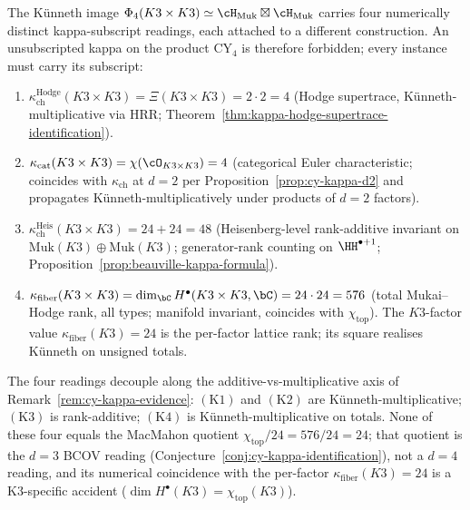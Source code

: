 \begin{remark}
\label{rem:phi-4-k3-k3-kappa-quartet}
%
%
The K\"unneth image $\Phi_4(K3 \times K3) \simeq \cH_{\mathrm{Muk}} \boxtimes \cH_{\mathrm{Muk}}$ carries four numerically distinct kappa-subscript readings, each attached to a different construction. An unsubscripted kappa on the product CY$_4$ is therefore forbidden; every instance must carry its subscript:
\begin{enumerate}[label=\textup{(K\arabic*)}]
\item $\kappa_{\mathrm{ch}}^{\mathrm{Hodge}}(K3 \times K3) = \Xi(K3 \times K3) = 2 \cdot 2 = 4$ \textup{(}Hodge supertrace, K\"unneth-multiplicative via HRR; Theorem~\textup{\ref{thm:kappa-hodge-supertrace-identification}}\textup{).}
\item $\kappa_{\mathrm{cat}}(K3 \times K3) = \chi(\cO_{K3 \times K3}) = 4$ \textup{(}categorical Euler characteristic; coincides with $\kappa_{\mathrm{ch}}$ at $d = 2$ per Proposition~\textup{\ref{prop:cy-kappa-d2}} and propagates K\"unneth-multiplicatively under products of $d = 2$ factors\textup{).}
\item $\kappa_{\mathrm{ch}}^{\mathrm{Heis}}(K3 \times K3) = 24 + 24 = 48$ \textup{(}Heisenberg-level rank-additive invariant on $\mathrm{Muk}(K3) \oplus \mathrm{Muk}(K3)$; generator-rank counting on $\HH^{\bullet+1}$; Proposition~\textup{\ref{prop:beauville-kappa-formula}}\textup{).}
\item $\kappa_{\mathrm{fiber}}(K3 \times K3) = \dim_\bC H^\bullet(K3 \times K3, \bC) = 24 \cdot 24 = 576$ \textup{(}total Mukai--Hodge rank, all types; manifold invariant, coincides with $\chi_{\mathrm{top}}$\textup{).} The $K3$-factor value $\kappa_{\mathrm{fiber}}(K3) = 24$ is the per-factor lattice rank; its square realises K\"unneth on unsigned totals.
\end{enumerate}
The four readings decouple along the additive-vs-multiplicative axis of Remark~\textup{\ref{rem:cy-kappa-evidence}}: $(\mathrm{K}1)$ and $(\mathrm{K}2)$ are K\"unneth-multiplicative; $(\mathrm{K}3)$ is rank-additive; $(\mathrm{K}4)$ is K\"unneth-multiplicative on totals. None of these four equals the MacMahon quotient $\chi_{\mathrm{top}}/24 = 576/24 = 24$; that quotient is the $d = 3$ BCOV reading (Conjecture~\textup{\ref{conj:cy-kappa-identification}}), not a $d = 4$ reading, and its numerical coincidence with the per-factor $\kappa_{\mathrm{fiber}}(K3) = 24$ is a K$3$-specific accident ($\dim H^\bullet(K3) = \chi_{\mathrm{top}}(K3)$).
\end{remark}

